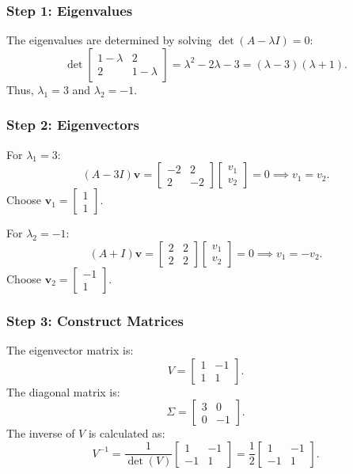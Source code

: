 \documentclass[12pt]{article}
\begin{document}
\subsubsection*{Step 1: Eigenvalues}
The eigenvalues are determined by solving \( \det(A - \lambda I) = 0 \):
\[
\det\begin{bmatrix} 1-\lambda & 2 \\ 2 & 1-\lambda \end{bmatrix} = \lambda^2 - 2\lambda - 3 = (\lambda - 3)(\lambda + 1).
\]
Thus, \( \lambda_1 = 3 \) and \( \lambda_2 = -1 \).

\subsubsection*{Step 2: Eigenvectors}
For \( \lambda_1 = 3 \):
\[
(A - 3I)\mathbf{v} = \begin{bmatrix} -2 & 2 \\ 2 & -2 \end{bmatrix}\begin{bmatrix} v_1 \\ v_2 \end{bmatrix} = 0 \implies v_1 = v_2.
\]
Choose \( \mathbf{v}_1 = \begin{bmatrix} 1 \\ 1 \end{bmatrix} \).

For \( \lambda_2 = -1 \):
\[
(A + I)\mathbf{v} = \begin{bmatrix} 2 & 2 \\ 2 & 2 \end{bmatrix}\begin{bmatrix} v_1 \\ v_2 \end{bmatrix} = 0 \implies v_1 = -v_2.
\]
Choose \( \mathbf{v}_2 = \begin{bmatrix} -1 \\ 1 \end{bmatrix} \).

\subsubsection*{Step 3: Construct Matrices}
The eigenvector matrix is:
\[
V = \begin{bmatrix} 1 & -1 \\ 1 & 1 \end{bmatrix}.
\]
The diagonal matrix is:
\[
\Sigma = \begin{bmatrix} 3 & 0 \\ 0 & -1 \end{bmatrix}.
\]
The inverse of \(V\) is calculated as:
\[
V^{-1} = \frac{1}{\det(V)}\begin{bmatrix} 1 & -1 \\ -1 & 1 \end{bmatrix} = \frac{1}{2}\begin{bmatrix} 1 & -1 \\ -1 & 1 \end{bmatrix}.
\]
\end{document}
